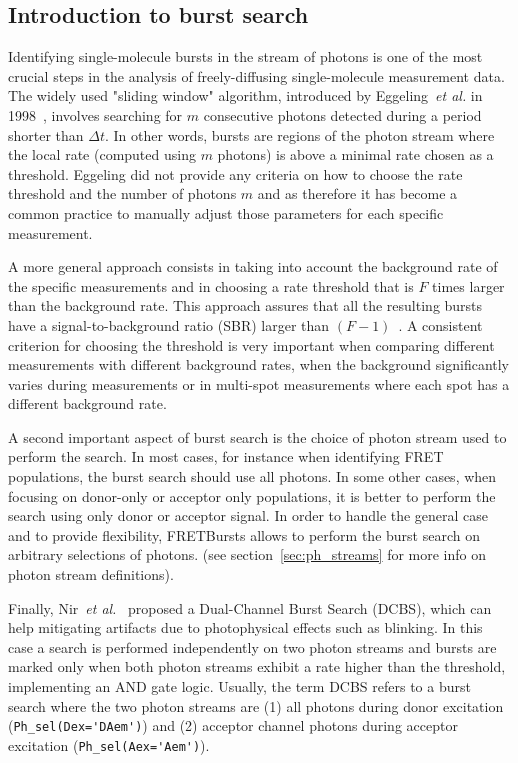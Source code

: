 \subsection{Introduction to burst search}
\label{sec:burstsearch_intro}

Identifying single-molecule bursts in the stream of photons is 
one of the most crucial steps in the analysis of freely-diffusing single-molecule measurement data.
The widely used "sliding window" algorithm, introduced by
Eggeling~\textit{et al.} in 1998~\cite{Eggeling_1998}, involves searching for
$m$ consecutive photons detected during a period shorter than
$\Delta t$. In other words, bursts are regions of the photon stream where the
local rate (computed using $m$ photons) is above a minimal rate chosen as a
threshold. Eggeling did not provide any criteria on how to choose the rate
threshold and the number of photons $m$ and as therefore it has become a common
practice to manually adjust those parameters for each specific measurement. 

A more general approach consists in taking into account the background rate of
the specific measurements and in choosing a rate threshold that is $F$ times
larger than the background rate. This approach assures that all the resulting bursts
have a signal-to-background ratio (SBR) larger than
$(F-1)$~\cite{Michalet_2012}. A consistent criterion for choosing the threshold is
very important when comparing different measurements with different background
rates, when the background significantly varies during measurements or in
multi-spot measurements where each spot has a different background rate.

A second important aspect of burst search is the choice of photon stream used
to perform the search.
In most cases, for instance when identifying FRET populations, 
the burst search should use all photons. In some other cases, when focusing on
donor-only or acceptor only populations, it is better to perform the search using
only donor or acceptor signal. 
In order to handle the general case and to provide flexibility, 
FRETBursts allows to perform the burst search on arbitrary selections of photons.
(see section~\ref{sec:ph_streams} for more info on photon stream definitions).

Finally, Nir~\textit{et al.}~\cite{Nir_2006} proposed a Dual-Channel Burst
Search (DCBS), which can help mitigating artifacts due to
photophysical effects such as blinking. In this case a search is performed
independently on two photon streams and bursts are marked only when both photon
streams exhibit a rate higher than the threshold, 
implementing an AND gate logic. 
Usually, the term DCBS refers to a burst search where the two photon streams
are (1) all photons 
during donor excitation (\verb|Ph_sel(Dex='DAem')|) and (2) acceptor channel photons
during acceptor 
excitation (\verb|Ph_sel(Aex='Aem')|).

